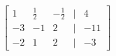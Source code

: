 \documentclass[preview]{standalone}
\begin{document}
\begin{align*}
\begin{bmatrix} 1 & \frac{1}{2} & -\frac{1}{2} & | & 4 \\ -3 & -1 & 2 & | & -11 \\ -2 & 1 & 2 & | & -3 \end{bmatrix}
\end{align*}
\end{document}
